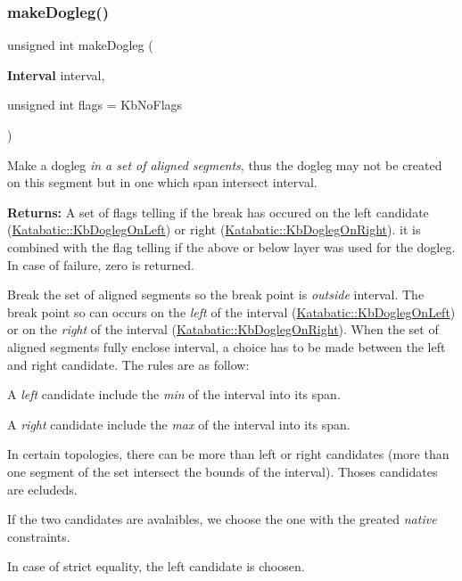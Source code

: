 \subsubsection{\texorpdfstring{make\+Dogleg()}{makeDogleg()}\hspace{0.1cm}{\footnotesize\ttfamily [2/3]}}
{\footnotesize\ttfamily unsigned int make\+Dogleg (\begin{DoxyParamCaption}\item[{\textbf{ Interval}}]{interval,  }\item[{unsigned int}]{flags = {\ttfamily KbNoFlags} }\end{DoxyParamCaption})}

Make a dogleg {\itshape in a set of aligned segments}, thus the dogleg may not be created on {\ttfamily this} segment but in one which span intersect {\ttfamily interval}.

{\bfseries Returns\+:} A set of flags telling if the break has occured on the left candidate (\hyperlink{namespaceKatabatic_a2af2ad6b6441614038caf59d04b3b217a67bb7c53bbbc73a0e2d1f3f3e16ab679}{Katabatic\+::\+Kb\+Dogleg\+On\+Left}) or right (\hyperlink{namespaceKatabatic_a2af2ad6b6441614038caf59d04b3b217afe7fcb4c332f36e477433169b3d3f515}{Katabatic\+::\+Kb\+Dogleg\+On\+Right}). it is combined with the flag telling if the above or below layer was used for the dogleg. In case of failure, zero is returned.

Break the set of aligned segments so the break point is {\itshape outside} {\ttfamily interval}. The break point so can occurs on the {\itshape left} of the interval (\hyperlink{namespaceKatabatic_a2af2ad6b6441614038caf59d04b3b217a67bb7c53bbbc73a0e2d1f3f3e16ab679}{Katabatic\+::\+Kb\+Dogleg\+On\+Left}) or on the {\itshape right} of the interval (\hyperlink{namespaceKatabatic_a2af2ad6b6441614038caf59d04b3b217afe7fcb4c332f36e477433169b3d3f515}{Katabatic\+::\+Kb\+Dogleg\+On\+Right}). When the set of aligned segments fully enclose {\ttfamily interval}, a choice has to be made between the left and right candidate. The rules are as follow\+:
\begin{DoxyItemize}
\item A {\itshape left} candidate include the {\itshape min} of the interval into it\textquotesingle{}s span.
\item A {\itshape right} candidate include the {\itshape max} of the interval into it\textquotesingle{}s span.
\item In certain topologies, there can be more than left or right candidates (more than one segment of the set intersect the bounds of the interval). Thoses candidates are ecludeds.
\item If the two candidates are avalaibles, we choose the one with the greated {\itshape native} constraints.
\item In case of strict equality, the left candidate is choosen.
\end{DoxyItemize}

